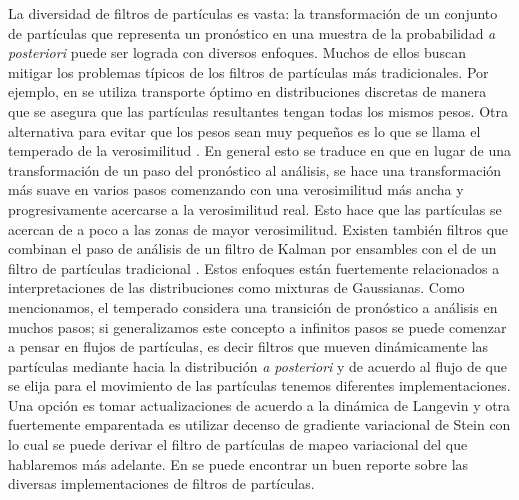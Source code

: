 La diversidad de filtros de partículas es vasta: la transformación de un conjunto de partículas que representa un pronóstico en una muestra de la probabilidad \textit{a posteriori} puede ser lograda con diversos enfoques. Muchos de ellos buscan mitigar los problemas típicos de los filtros de partículas más tradicionales. Por ejemplo, en \cite{Reich2013} se utiliza transporte óptimo en distribuciones discretas de manera que se asegura que las partículas resultantes tengan todas los mismos pesos. Otra alternativa para evitar que los pesos sean muy pequeños es lo que se llama el temperado de la verosimilitud \citep{Neal1996}. En general esto se traduce en que en lugar de una transformación de un paso del pronóstico al análisis, se hace una transformación más suave en varios pasos comenzando con una verosimilitud más ancha y progresivamente acercarse a la verosimilitud real. Esto hace que las partículas se acercan de a poco a las zonas de mayor verosimilitud. Existen también filtros que combinan el paso de análisis de un filtro de Kalman por ensambles con el de un filtro de partículas tradicional \cite{Stordal2011, Frei2013}. Estos enfoques están fuertemente relacionados a interpretaciones de las distribuciones como mixturas de Gaussianas. Como mencionamos, el temperado considera una transición de pronóstico a análisis en muchos pasos; si generalizamos este concepto a infinitos pasos se puede comenzar a pensar en 
flujos de partículas, es decir filtros que mueven dinámicamente las partículas mediante hacia la distribución \textit{a posteriori} y de acuerdo al flujo de que se elija para el movimiento de las partículas tenemos diferentes implementaciones. Una opción es tomar actualizaciones de acuerdo a la dinámica de Langevin \citep{Liu2017} y otra fuertemente emparentada es utilizar decenso de gradiente variacional de Stein \cite{Liu2016} con lo cual se puede derivar el filtro de partículas de mapeo variacional \citep{Pulido2019} del que hablaremos más adelante. En \cite{vanLeeuwen2019} se puede encontrar un buen reporte sobre las diversas implementaciones de filtros de partículas. 

